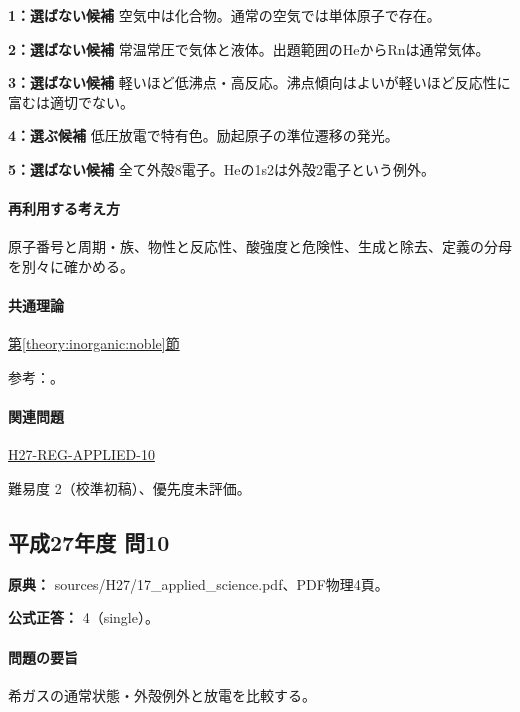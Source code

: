 \noindent\textbf{1：選ばない候補} 空気中は化合物。通常の空気では単体原子で存在。\par

\noindent\textbf{2：選ばない候補} 常温常圧で気体と液体。出題範囲のHeからRnは通常気体。\par

\noindent\textbf{3：選ばない候補} 軽いほど低沸点・高反応。沸点傾向はよいが軽いほど反応性に富むは適切でない。\par

\noindent\textbf{4：選ぶ候補} 低圧放電で特有色。励起原子の準位遷移の発光。\par

\noindent\textbf{5：選ばない候補} 全て外殻8電子。Heの1s2は外殻2電子という例外。\par

\paragraph{再利用する考え方} 原子番号と周期・族、物性と反応性、酸強度と危険性、生成と除去、定義の分母を別々に確かめる。

\paragraph{共通理論} \hyperref[theory:inorganic:noble]{第\ref*{theory:inorganic:noble}節}

\par 参考：\cite{inorganic_noble_ref}。

\paragraph{関連問題} \hyperref[q:h27-reg-applied-10]{H27-REG-APPLIED-10}

\par 難易度 2（校準初稿）、優先度未評価。

\subsection{平成27年度 問10}
\label{q:h27-reg-applied-10}

\noindent\textbf{原典：} sources/H27/17\_applied\_science.pdf、PDF物理4頁。

\textbf{公式正答：} 4（single）。

\paragraph{問題の要旨} 希ガスの通常状態・外殻例外と放電を比較する。

